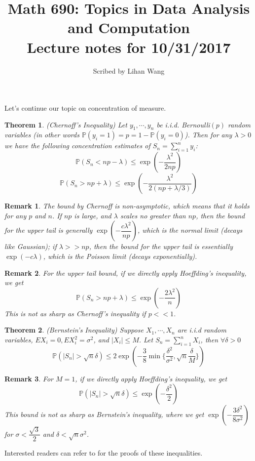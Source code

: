 \documentclass[12pt]{article}
\title{Math 690: Topics in Data Analysis and Computation \\ 
Lecture notes for 10/31/2017}
\date{}
\author{Scribed by Lihan Wang}
\theoremstyle{plain}
\newtheorem*{theorem}{Theorem}
\newtheorem*{remark}{Remark}
\begin{document}
	\everymath{\displaystyle}
\maketitle

Let's continue our topic on concentration of measure.
 \begin{theorem} 
 	(Chernoff's Inequality) Let $y_1,\cdots,y_n$ be i.i.d. Bernoulli$(p)$ random variables (in other words $\mathbb{P}(y_i=1)=p=1-\mathbb{P}(y_i=0)$). Then for any $\lambda>0$ we have the following concentration estimates of $S_n=\sum_{i=1}^{n}y_i$:
 	\[ \mathbb{P}(S_n<np-\lambda)\le \exp(-\dfrac{\lambda^2}{2np}) \]
 	\[ \mathbb{P}(S_n>np+\lambda)\le \exp(-\dfrac{\lambda^2}{2(np+\lambda/3)})    \]
 	
 \end{theorem}

\begin{remark}
	The bound by Chernoff is non-asymptotic, which means that it holds for any $p$ and $n$. If $np$ is large, and $\lambda$ scales no greater than $np$, then the bound for the upper tail is generally $\exp(-\dfrac{c\lambda^2}{np})$, which is the normal limit (decays like Gaussian); if $\lambda >>np$, then the bound for the upper tail is essentially $\exp(-c\lambda)$, which is the Poisson limit (decays exponentially).
\end{remark}

\begin{remark}
	For the upper tail bound, if we directly apply Hoeffding's inequality, we get \[ \mathbb{P}(S_n>np+\lambda)\le \exp(-\dfrac{2\lambda^2}{n})   \] This is not as sharp as Chernoff's inequality if $p<<1$.
\end{remark}


\begin{theorem}
	(Bernstein's Inequality) Suppose $X_1,\cdots,X_n$ are i.i.d random variables, $EX_i=0, EX_i^2=\sigma^2$, and $|X_i|\le M$. Let $S_n=\sum_{i=1}^n X_i$, then $\forall \delta>0$ \[\mathbb{P}(|S_n|>\sqrt{n}\delta)\le 2\exp(-\dfrac{3}{8}\min\{\dfrac{\delta^2}{\sigma^2},\sqrt{n}\dfrac{\delta}{M} \})  \]
\end{theorem}

\begin{remark}
	For $M=1$, if we directly apply Hoeffding's inequality, we get \[ \mathbb{P}(|S_n|>\sqrt{n}\delta)\le \exp(-\dfrac{\delta^2}{2})   \] This bound is not as sharp as Bernstein's inequality, where we get $\exp(-\dfrac{3\delta^2}{8\sigma^2})$ for $\sigma<\dfrac{\sqrt{3}}{2}$ and $\delta <\sqrt{n}\sigma^2$.
\end{remark}
 Interested readers can refer to \cite{tao} for the proofs of these inequalities.
 \newline
 
\end{document}
